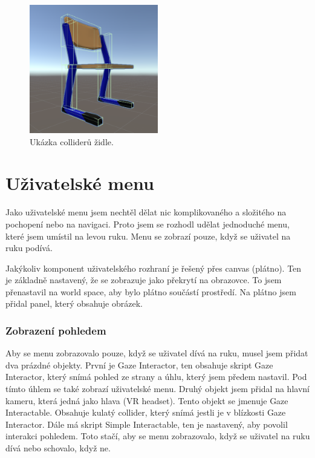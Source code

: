 \documentclass[12pt, a4paper,
twoside,        %
openright
]{report}
\begin{document}
\begin{figure}[H]
	\centering
	\includegraphics[width=0.5\textwidth]{image/chair.png}
	\caption{Ukázka colliderů židle.}
	\label{fig:collidery_zidle}
\end{figure}

\newpage 

\section{Uživatelské menu}
\label{sec:uzivatelske_menu}
Jako uživatelské menu jsem nechtěl dělat nic komplikovaného a složitého na pochopení nebo na navigaci. Proto jsem se rozhodl udělat jednoduché menu, které jsem umístil na levou ruku. Menu se zobrazí pouze, když se uživatel na ruku podívá.

Jakýkoliv komponent uživatelského rozhraní je řešený přes canvas (plátno). Ten je základně nastavený, že se zobrazuje jako překrytí na obrazovce. To jsem přenastavil na world space, aby bylo plátno součástí prostředí. Na plátno jsem přidal panel, který obsahuje obrázek. 

\subsubsection{Zobrazení pohledem}
Aby se menu zobrazovalo pouze, když se uživatel dívá na ruku, musel jsem přidat dva prázdné objekty. První je Gaze Interactor, ten obsahuje skript Gaze Interactor, který snímá pohled ze strany a úhlu, který jsem předem nastavil. Pod tímto úhlem se také zobrazí uživatelské menu. Druhý objekt jsem přidal na hlavní kameru, která jedná jako hlava (VR headset). Tento objekt se jmenuje Gaze Interactable. Obsahuje kulatý collider, který snímá jestli je v blízkosti Gaze Interactor. Dále má skript Simple Interactable, ten je nastavený, aby povolil interakci pohledem. Toto stačí, aby se menu zobrazovalo, když se uživatel na ruku dívá nebo schovalo, když ne.
\end{document}
